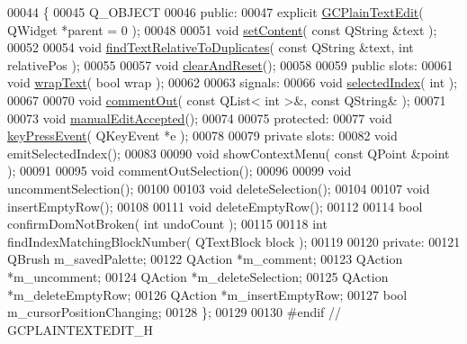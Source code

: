 \begin{DoxyCode}
00044 \{
00045   Q\_OBJECT
00046 \textcolor{keyword}{public}:
00047   \textcolor{keyword}{explicit} \hyperlink{class_g_c_plain_text_edit}{GCPlainTextEdit}( QWidget *parent = 0 );
00048 
00051   \textcolor{keywordtype}{void} \hyperlink{class_g_c_plain_text_edit_af658d66d1fe8c1885d708de16b115b0f}{setContent}( \textcolor{keyword}{const} QString &text );
00052 
00054   \textcolor{keywordtype}{void} \hyperlink{class_g_c_plain_text_edit_a9c3603b9e62a7737b8d442da4a16109d}{findTextRelativeToDuplicates}( \textcolor{keyword}{const} QString &text, \textcolor{keywordtype}{int} relativePos );
00055 
00057   \textcolor{keywordtype}{void} \hyperlink{class_g_c_plain_text_edit_a974f08b952447cec6f1935140d9808b1}{clearAndReset}();
00058 
00059 \textcolor{keyword}{public} slots:
00061   \textcolor{keywordtype}{void} \hyperlink{class_g_c_plain_text_edit_a56df0b287c0440a3f8f0f749929227f2}{wrapText}( \textcolor{keywordtype}{bool} wrap );
00062   
00063 signals:
00066   \textcolor{keywordtype}{void} \hyperlink{class_g_c_plain_text_edit_aa318864494827fed57e319302f74ec89}{selectedIndex}( \textcolor{keywordtype}{int} );
00067 
00070   \textcolor{keywordtype}{void} \hyperlink{class_g_c_plain_text_edit_a5df13199f02cf478a436689d52924201}{commentOut}( \textcolor{keyword}{const} QList< int >&, \textcolor{keyword}{const} QString& );
00071 
00073   \textcolor{keywordtype}{void} \hyperlink{class_g_c_plain_text_edit_a1c4c9e285ce6803e23637b725cda37ea}{manualEditAccepted}();
00074 
00075 \textcolor{keyword}{protected}:
00077   \textcolor{keywordtype}{void} \hyperlink{class_g_c_plain_text_edit_aed3616e5adab461d83bc6ab1497128e2}{keyPressEvent}( QKeyEvent *e );
00078 
00079 \textcolor{keyword}{private} slots:
00082   \textcolor{keywordtype}{void} emitSelectedIndex();
00083 
00090   \textcolor{keywordtype}{void} showContextMenu( \textcolor{keyword}{const} QPoint &point );
00091 
00095   \textcolor{keywordtype}{void} commentOutSelection();
00096 
00099   \textcolor{keywordtype}{void} uncommentSelection();
00100 
00103   \textcolor{keywordtype}{void} deleteSelection();
00104 
00107   \textcolor{keywordtype}{void} insertEmptyRow();
00108 
00111   \textcolor{keywordtype}{void} deleteEmptyRow();
00112 
00114   \textcolor{keywordtype}{bool} confirmDomNotBroken( \textcolor{keywordtype}{int} undoCount );
00115 
00118   \textcolor{keywordtype}{int} findIndexMatchingBlockNumber( QTextBlock block );
00119 
00120 \textcolor{keyword}{private}:
00121   QBrush   m\_savedPalette;
00122   QAction *m\_comment;
00123   QAction *m\_uncomment;
00124   QAction *m\_deleteSelection;
00125   QAction *m\_deleteEmptyRow;
00126   QAction *m\_insertEmptyRow;
00127   \textcolor{keywordtype}{bool} m\_cursorPositionChanging;
00128 \};
00129 
00130 \textcolor{preprocessor}{#endif // GCPLAINTEXTEDIT\_H}
\end{DoxyCode}

